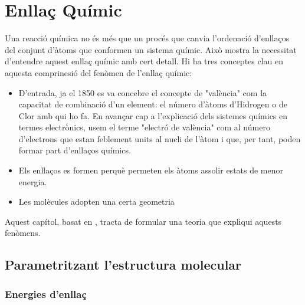 \chapter{Enllaç Químic}

Una reacció química no és més que un procés que canvia l'ordenació d'enllaços del conjunt d'àtoms que conformen un sistema químic.
Això mostra la necessitat d'entendre aquest enllaç químic amb cert detall.
Hi ha tres conceptes clau en aquesta comprinesió del fenòmen de l'enllaç químic:
\begin{itemize}
\item D'entrada, ja el 1850 es va concebre el concepte de "valència" com la capacitat de combinació d'un element: el número d'àtoms d'Hidrogen o de Clor amb qui ho fa. 
En avançar cap a l'explicació dels sistemes químics en termes electrònics, usem el terme "electró de valència" com al número d'electrons que estan feblement units al nucli de l'àtom i que, per tant, poden formar part d'enllaços químics.
\item Els enllaços es formen perquè permeten els àtoms assolir estats de menor energia.
\item Les molècules adopten una certa geometria
\end{itemize}

Aquest capítol, basat en \cite{Mahan1977}, tracta de formular una teoria que expliqui aquests fenòmens.

\section{Parametritzant l'estructura molecular}

\subsection{Energies d'enllaç}

